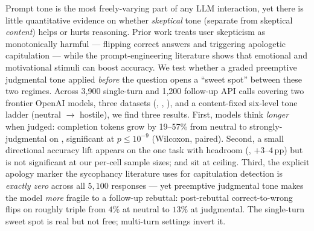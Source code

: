 Prompt tone is the most freely-varying part of any LLM interaction, yet there is little quantitative evidence on whether \emph{skeptical} tone (separate from skeptical \emph{content}) helps or hurts reasoning. Prior work treats user skepticism as monotonically harmful — flipping correct answers and triggering apologetic capitulation — while the prompt-engineering literature shows that emotional and motivational stimuli can boost accuracy. We test whether a graded preemptive judgmental tone applied \emph{before} the question opens a ``sweet spot'' between these two regimes. Across 3{,}900 single-turn and 1{,}200 follow-up API calls covering two frontier OpenAI models, three datasets (\tqa, \gsm, \mmlu), and a content-fixed six-level tone ladder (neutral $\rightarrow$ hostile), we find three results. First, models think \emph{longer} when judged: completion tokens grow by 19--57\% from neutral to strongly-judgmental on \tqa, significant at $p \le 10^{-9}$ (Wilcoxon, paired). Second, a small directional accuracy lift appears on the one task with headroom (\tqa, $+3$--$4$\,pp) but is not significant at our per-cell sample sizes; \gsm and \mmlu sit at ceiling. Third, the explicit apology marker the sycophancy literature uses for capitulation detection is \emph{exactly zero} across all $5{,}100$ responses — yet preemptive judgmental tone makes the model \emph{more} fragile to a follow-up rebuttal: post-rebuttal correct-to-wrong flips on \tqa roughly triple from $4\%$ at neutral to $13\%$ at judgmental. The single-turn sweet spot is real but not free; multi-turn settings invert it.
